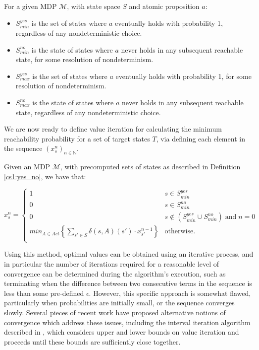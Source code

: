\begin{definition}
\label{cs1:yes_no}

For a given MDP $\mathcal{M}$, with state space $S$ and atomic proposition $a$:

\begin{itemize}
    \item $S^{yes}_{min}$ is the set of states where $a$ eventually holds with probability 1, regardless of any nondeterministic choice.
    \item $S^{no}_{min}$ is the state of states where $a$ never holds in any subsequent reachable state, for some resolution of nondeterminism.
    \item $S^{yes}_{max}$ is the set of states where $a$ eventually holds with probability 1, for some resolution of nondeterminism.
    \item $S^{no}_{max}$ is the state of states where $a$ never holds in any subsequent reachable state, regardless of any nondeterministic choice.  
\end{itemize}
\end{definition}

We are now ready to define value iteration for calculating the minimum reachability probability for a set of target states $T$, via defining each element in the sequence $(x^n_s)_{n \in \mathbb{N}}$.

\begin{definition}
\label{cs1:value_iteration}

Given an MDP $\mathcal{M}$, with precomputed sets of states as described in Definition \ref{cs1:yes_no}, we have that:

\begin{equation*}
x^n_s = \begin{cases}
        1 & s \in S^{yes}_{min} \\
        0 & s \in S^{no}_{min} \\
        0 & s \notin (S^{yes}_{min} \cup S^{no}_{min}) \; \text{and} \; n=0 \\
        min_{A \in Act} \left\{ \sum_{s' \in S}\delta(s,A)(s') \cdot x^{n-1}_{s'} \right\} & \text{otherwise.} \\
    \end{cases}
\end{equation*}

\end{definition}

Using this method, optimal values can be obtained using an iterative process, and in particular the number of iterations required for a reasonable level of convergence can be determined during the algorithm's execution, such as terminating when the difference between two consecutive terms in the sequence is less than some pre-defined $\epsilon$. However, this specific approach is somewhat flawed, particularly when probabilities are initially small, or the sequence converges slowly. Several pieces of recent work have proposed alternative notions of convergence which address these issues, including the interval iteration algorithm described in \cite{haddad_interval_2018}, which considers upper and lower bounds on value iteration and proceeds until these bounds are sufficiently close together.

